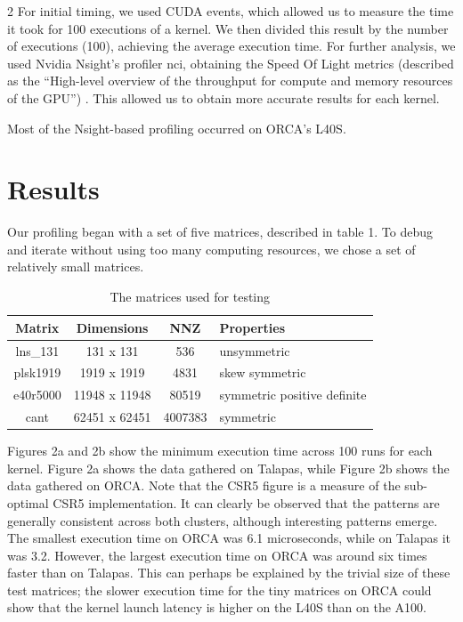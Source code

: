 \documentclass{article}
\begin{document}
\begin{multicols}{2}
For initial timing, we used CUDA events, which allowed us to measure the time it took for 100 executions of a kernel. We then divided this result by the number of executions (100), achieving the average execution time. For further analysis, we used Nvidia Nsight’s profiler nci, obtaining the Speed Of Light metrics (described as the “High-level overview of the throughput for compute and memory resources of the GPU”) \cite{NsightCompute2023}. This allowed us to obtain more accurate results for each kernel. 

Most of the Nsight-based profiling occurred on ORCA’s L40S.

\section{Results}

Our profiling began with a set of five matrices, described in table 1. To debug and iterate without using too many computing resources, we chose a set of relatively small matrices.

\begin{table}[h]
   \centering
   \caption{The matrices used for testing}
   \label{table1}
   \begin{tabular}{|c|c|c|l|}
	\hline
	Matrix & Dimensions & NNZ & Properties \\
	\hline
	lns_131 & 131 x 131 & 536 & unsymmetric \\
	\hline
	plsk1919 & 1919 x 1919 & 4831 & skew symmetric \\
	\hline
	e40r5000 & 11948 x 11948 & 80519 & symmetric positive definite \\
	\hline
	cant & 62451 x 62451 & 4007383 & symmetric \\
	\hline
   \end{tabular}
\end{table}
 
Figures 2a and 2b show the minimum execution time across 100 runs for each kernel. Figure 2a shows the data gathered on Talapas, while Figure 2b shows the data gathered on ORCA. Note that the CSR5 figure is a measure of the sub-optimal CSR5 implementation. It can clearly be observed that the patterns are generally consistent across both clusters, although interesting patterns emerge. The smallest execution time on ORCA was 6.1 microseconds, while on Talapas it was 3.2. However, the largest execution time on ORCA was around six times faster than on Talapas. This can perhaps be explained by the trivial size of these test matrices; the slower execution time for the tiny matrices on ORCA could show that the kernel launch latency is higher on the L40S than on the A100. 


\end{multicols}
\end{document}
